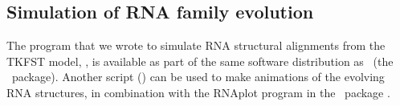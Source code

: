 \documentclass[10pt]{article}
\begin{document}
\subsection{Simulation of RNA family evolution}
The program that we wrote to simulate RNA structural alignments from the TKFST model, \evolsayer, is available as part of the same software distribution as \indiegram\ (the \dart\ package).
Another script (\animateevolsayer) can be used to make animations of the evolving RNA structures, in combination with the RNAplot program in the \viennarna\ package \cite{HofackerEtAl94}.




\end{document}

